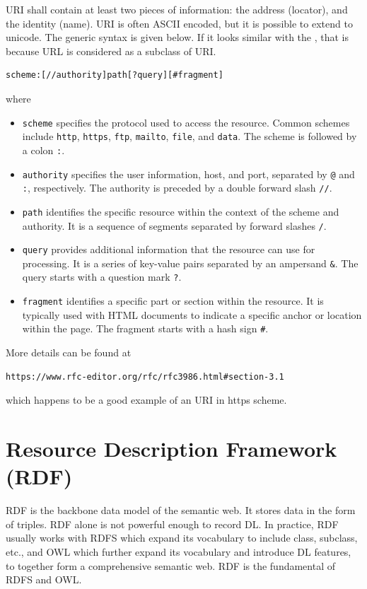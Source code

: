URI shall contain at least two pieces of information: the address (locator), and the identity (name). URI is often ASCII encoded, but it is possible to extend to unicode. The generic syntax is given below. If it looks similar with the , that is because URL is considered as a subclass of URI.
\begin{lstlisting}
scheme:[//authority]path[?query][#fragment]
\end{lstlisting}
where
\begin{itemize}
\item \verb|scheme| specifies the protocol used to access the resource. Common schemes include \verb|http|, \verb|https|, \verb|ftp|, \verb|mailto|, \verb|file|, and \verb|data|. The scheme is followed by a colon \verb|:|.
\item \verb|authority| specifies the user information, host, and port, separated by \verb|@| and \verb|:|, respectively. The authority is preceded by a double forward slash \verb|//|.
\item \verb|path| identifies the specific resource within the context of the scheme and authority. It is a sequence of segments separated by forward slashes \verb|/|.
\item \verb|query| provides additional information that the resource can use for processing. It is a series of key-value pairs separated by an ampersand \verb|&|. The query starts with a question mark \verb|?|.
\item \verb|fragment| identifies a specific part or section within the resource. It is typically used with HTML documents to indicate a specific anchor or location within the page. The fragment starts with a hash sign \verb|#|.
\end{itemize}
More details can be found at
\begin{lstlisting}
https://www.rfc-editor.org/rfc/rfc3986.html#section-3.1
\end{lstlisting}
which happens to be a good example of an URI in https scheme.

\section{Resource Description Framework (RDF)}

RDF is the backbone data model of the semantic web. It stores data in the form of triples. RDF alone is not powerful enough to record DL. In practice, RDF usually works with RDFS which expand its vocabulary to include class, subclass, etc., and OWL which further expand its vocabulary and introduce DL features, to together form a comprehensive semantic web. RDF is the fundamental of RDFS and OWL.


